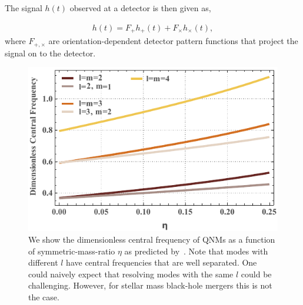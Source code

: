 The signal $h(t)$ observed at a detector is then given as, 

\begin{align}
h(t)=F_{+}h_{+}(t) +F_{\times }h_{\times}(t),
\end{align}
where $F_{+, \times}$ are orientation-dependent detector pattern functions that project the signal on to the detector. 


\begin{figure}[b!]
\includegraphics[width=\columnwidth]{figures/DimFreqPlot_Final.pdf}
\caption{\label{fig:DimFreqPlot}We show the dimensionless central frequency of QNMs as a function of symmetric-mass-ratio $\eta$ as predicted by~\cite{PhysRevD.73.064030}. Note that modes with different $l$ have central frequencies that are well separated. One could naively expect that resolving modes with the same $l$ could be challenging. However, for stellar mass black-hole mergers this is not the case.}
\end{figure}



